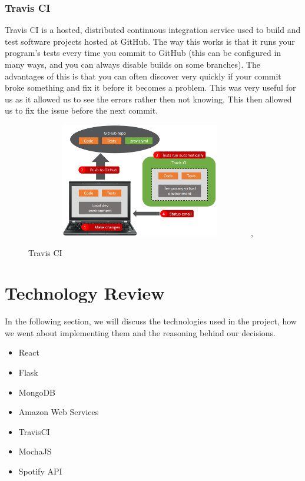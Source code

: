 \subsection{Travis CI}
Travis CI is a hosted, distributed continuous integration service used to build and test software projects hosted at GitHub. The way this works is that it runs your program's tests every time you commit to GitHub (this can be configured in many ways, and you can always disable builds on some branches). The advantages of this is that you can often discover very quickly if your commit broke something and fix it before it becomes a problem. This was very useful for us as it allowed us to see the errors rather then not knowing. This then allowed us to fix the issue before the next commit. 

\begin{figure}[ht]
\renewcommand\thefigure{3.3}
\centering
\includegraphics[width=10cm, height=5cm]{img/travis.png},
\caption{Travis CI}
\label{TravisCI}
\end{figure}


\chapter{Technology Review}
In the following section, we will discuss the technologies used in the project, how we went about implementing them and the reasoning behind our decisions.

\begin{itemize}
  \item React
  \item Flask
  \item MongoDB
  \item Amazon Web Services
  \item TravisCI
  \item MochaJS
  \item Spotify API
  \end{itemize}

